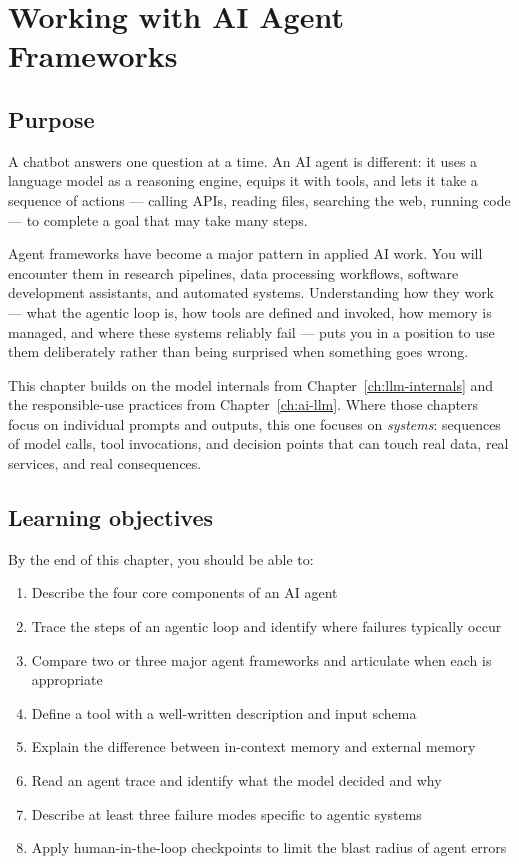 \chapter{Working with AI Agent Frameworks}
\label{ch:ai-agents}

\section*{Purpose}

A chatbot answers one question at a time. An AI agent is different: it uses a language model as a reasoning engine, equips it with tools, and lets it take a sequence of actions --- calling APIs, reading files, searching the web, running code --- to complete a goal that may take many steps.

Agent frameworks have become a major pattern in applied AI work. You will encounter them in research pipelines, data processing workflows, software development assistants, and automated systems. Understanding how they work --- what the agentic loop is, how tools are defined and invoked, how memory is managed, and where these systems reliably fail --- puts you in a position to use them deliberately rather than being surprised when something goes wrong.

This chapter builds on the model internals from Chapter~\ref{ch:llm-internals} and the responsible-use practices from Chapter~\ref{ch:ai-llm}. Where those chapters focus on individual prompts and outputs, this one focuses on \emph{systems}: sequences of model calls, tool invocations, and decision points that can touch real data, real services, and real consequences.

\section*{Learning objectives}

By the end of this chapter, you should be able to:

\begin{enumerate}[noitemsep,topsep=0pt]
  \item Describe the four core components of an AI agent
  \item Trace the steps of an agentic loop and identify where failures typically occur
  \item Compare two or three major agent frameworks and articulate when each is appropriate
  \item Define a tool with a well-written description and input schema
  \item Explain the difference between in-context memory and external memory
  \item Read an agent trace and identify what the model decided and why
  \item Describe at least three failure modes specific to agentic systems
  \item Apply human-in-the-loop checkpoints to limit the blast radius of agent errors
\end{enumerate}

